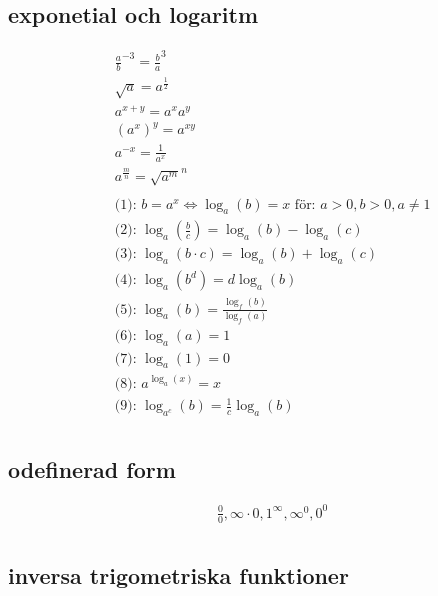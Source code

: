 \subsection{exponetial och logaritm}  %
\begin{align*}
  &\quad {\frac{a}{b}}^{-3} = {\frac{b}{a}}^{3} \\
  &\quad \sqrt{a} = a^{\frac{1}{2}} \\
  &\quad a^{x+y}=a^{x}a^{y} \\
  &\quad {(a^{x})}^y=a^{xy} \\
  &\quad a^{-x}=\frac{1}{a^x} \\
  &\quad a^{\frac{m}{n}}={\sqrt{a^{m}}}^{n} \\
  &\quad  \\
  &\quad \text{(1): } b = a^x \Leftrightarrow \log_a(b) = x  \text{ för: } a>0, b>0, a \ne 1  \\
  &\quad \text{(2): } \log_a(\frac{b}{c}) = \log_a(b) - \log_a(c) \\
  &\quad \text{(3): } \log_a(b \cdot c) = \log_a(b) + \log_a(c) \\
  &\quad \text{(4): } \log_a(b^d) = d\log_a(b) \\
  &\quad \text{(5): } \log_a(b) = \frac{\log_f(b)}{\log_f(a)} \\
  &\quad \text{(6): } \log_a(a) = 1 \\
  &\quad \text{(7): } \log_a(1) = 0 \\
  &\quad \text{(8): } a^{\log_a(x)} = x \\
  &\quad \text{(9): } \log_{a^c}(b) = \frac{1}{c} \log_a(b) \\
\end{align*}



\subsection{odefinerad form}
\begin{align*}
  &\quad  \frac{0}{0},\infty\cdot{0},1^{\infty},\infty^0,0^0 \\
\end{align*}


\newpage

\subsection{inversa trigometriska funktioner}
